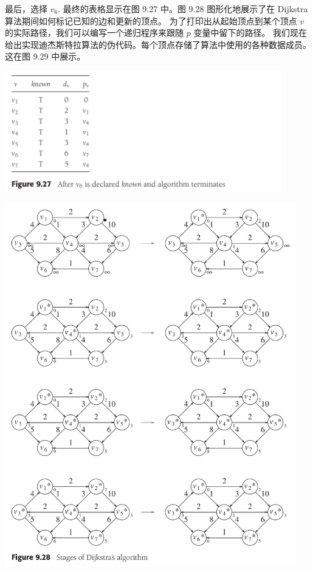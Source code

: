 \documentclass[a4paper]{ctexart}
\theoremstyle{definition}
\theoremstyle{definition}
\begin{document}
最后，选择 \( v_6 \). 最终的表格显示在图 9.27 中。图 9.28 图形化地展示了在 Dijkstra 算法期间如何标记已知的边和更新的顶点。
为了打印出从起始顶点到某个顶点 \( v \) 的实际路径，我们可以编写一个递归程序来跟随 \( p \) 变量中留下的路径。
我们现在给出实现迪杰斯特拉算法的伪代码。每个顶点存储了算法中使用的各种数据成员。这在图 9.29 中展示。

\begin{center}
  \includegraphics[width=0.9\textwidth]{images/FIG9_27.png}
\end{center}

\begin{center}
  \includegraphics[width=0.95\textwidth]{images/FIG9_28.png}
\end{center}
\end{document}
